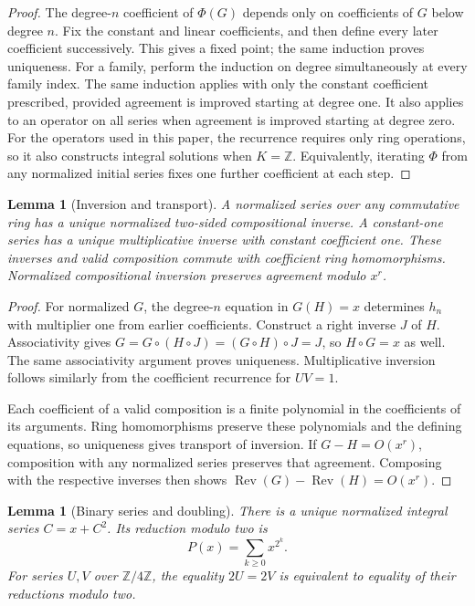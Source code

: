 \documentclass[11pt,a4paper]{article}
\newtheorem{lemma}[theorem]{Lemma}
\theoremstyle{remark}
\newcommand{\Z}{\mathbb Z}
\newcommand{\Rev}{\operatorname{Rev}}
\begin{document}
\begin{proof}
The degree-$n$ coefficient of $\Phi(G)$ depends only on coefficients of
$G$ below degree $n$. Fix the constant and linear coefficients, and then
define every later coefficient successively. This gives a fixed point;
the same induction proves uniqueness. For a family, perform the induction
on degree simultaneously at every family index. The same induction applies with only the constant coefficient prescribed,
provided agreement is improved starting at degree one. It also applies to
an operator on all series when agreement is improved starting at degree zero.
For the operators used in this paper, the recurrence requires
only ring operations, so it also constructs integral solutions when
$K=\Z$. Equivalently, iterating $\Phi$ from any normalized initial series
fixes one further coefficient at each step.
\end{proof}

\begin{lemma}[Inversion and transport]\label{lem:inverse}
A normalized series over any commutative ring has a unique normalized
two-sided compositional inverse. A constant-one series has a unique
multiplicative inverse with constant coefficient one. These inverses and
valid composition commute with coefficient ring homomorphisms.
Normalized compositional inversion preserves agreement modulo $x^r$.
\end{lemma}

\begin{proof}
For normalized $G$, the degree-$n$ equation in $G(H)=x$ determines $h_n$
with multiplier one from earlier coefficients. Construct a right inverse
$J$ of $H$. Associativity gives
$G=G\circ(H\circ J)=(G\circ H)\circ J=J$, so $H\circ G=x$ as well.
The same associativity argument proves uniqueness. Multiplicative
inversion follows similarly from the coefficient recurrence for $UV=1$.

Each coefficient of a valid composition is a finite polynomial in the
coefficients of its arguments. Ring homomorphisms preserve these
polynomials and the defining equations, so uniqueness gives transport of
inversion. If $G-H=O(x^r)$, composition with any normalized series
preserves that agreement. Composing with the respective inverses then
shows $\Rev(G)-\Rev(H)=O(x^r)$.
\end{proof}

\begin{lemma}[Binary series and doubling]\label{lem:binary}
There is a unique normalized integral series $C=x+C^2$. Its reduction
modulo two is
\[
 P(x)=\sum_{k\ge0}x^{2^k}.
\]
For series $U,V$ over $\Z/4\Z$, the equality $2U=2V$ is equivalent to
equality of their reductions modulo two.
\end{lemma}
\end{document}
